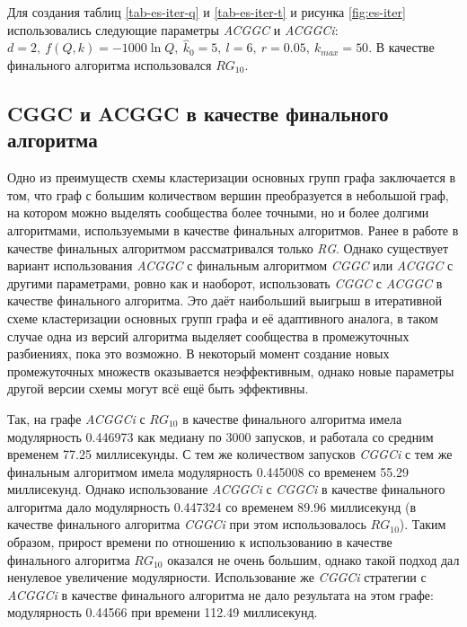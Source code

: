 Для создания таблиц \ref{tab-es-iter-q} и \ref{tab-es-iter-t} и рисунка \ref{fig:es-iter} использовались следующие параметры \emph{ACGGC} и \emph{ACGGCi}: $d = 2,\ f(Q, k) = -1000 \ln Q,\ \hat{k}_0 = 5,\ l = 6,\ r = 0.05,\ k_{max} = 50$. В качестве финального алгоритма использовался $RG_{10}$.



\subsection{CGGC и ACGGC в качестве финального алгоритма}
\label{subsec:cggc-as-final}

Одно из преимуществ схемы кластеризации основных групп графа заключается в том, что граф с большим количеством вершин преобразуется в небольшой граф, на котором можно выделять сообщества более точными, но и более долгими алгоритмами, используемыми в качестве финальных алгоритмов. Ранее в работе в качестве финальных алгоритмом рассматривался только \emph{RG}. Однако существует вариант использования \emph{ACGGC} с финальным алгоритмом \emph{CGGC} или \emph{ACGGC} с другими параметрами, ровно как и наоборот, использовать \emph{CGGC} с \emph{ACGGC} в качестве финального алгоритма. Это даёт наибольший выигрыш в итеративной схеме кластеризации основных групп графа и её адаптивного аналога, в таком случае одна из версий алгоритма выделяет сообщества в промежуточных разбиениях, пока это возможно. В некоторый момент создание новых промежуточных множеств оказывается неэффективным, однако новые параметры другой версии схемы могут всё ещё быть эффективны.

Так, на графе \emph{\celegans} \emph{ACGGCi} с $RG_{10}$ в качестве финального алгоритма имела модулярность 0.446973 как медиану по 3000 запусков, и работала со средним временем 77.25 миллисекунды. С тем же количеством запусков \emph{CGGCi} с тем же финальным алгоритмом имела модулярность 0.445008 со временем 55.29 миллисекунд. Однако использование \emph{ACGGCi} с \emph{CGGCi} в качестве финального алгоритма дало модулярность 0.447324 со временем 89.96 миллисекунд (в качестве финального алгоритма \emph{CGGCi} при этом использовалось $RG_{10}$). Таким образом, прирост времени по отношению к использованию в качестве финального алгоритма $RG_{10}$ оказался не очень большим, однако такой подход дал ненулевое увеличение модулярности. Использование же \emph{CGGCi} стратегии с \emph{ACGGCi} в качестве финального алгоритма не дало результата на этом графе: модулярность 0.44566 при времени 112.49 миллисекунд.

